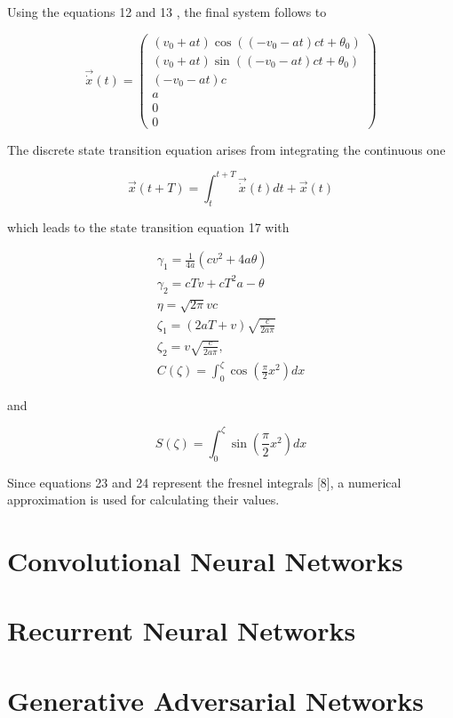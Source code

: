 Using the equations 12 and 13 , the final system follows to

$$
\overrightarrow{\dot{x}}(t)=\left(\begin{array}{c}
	\left(v_{0}+a t\right) \cos \left(\left(-v_{0}-a t\right) c t+\theta_{0}\right) \\
	\left(v_{0}+a t\right) \sin \left(\left(-v_{0}-a t\right) c t+\theta_{0}\right) \\
	\left(-v_{0}-a t\right) c \\
	a \\
	0 \\
	0
\end{array}\right)
$$

The discrete state transition equation arises from integrating the continuous one

$$
\vec{x}(t+T)=\int_{t}^{t+T} \overrightarrow{\dot{x}}(t) d t+\vec{x}(t)
$$

which leads to the state transition equation 17 with

$$
\begin{gathered}
	\gamma_{1}=\frac{1}{4 a}\left(c v^{2}+4 a \theta\right) \\
	\gamma_{2}=c T v+c T^{2} a-\theta \\
	\eta=\sqrt{2 \pi} v c \\
	\zeta_{1}=(2 a T+v) \sqrt{\frac{c}{2 a \pi}} \\
	\zeta_{2}=v \sqrt{\frac{c}{2 a \pi}}, \\
	C(\zeta)=\int_{0}^{\zeta} \cos \left(\frac{\pi}{2} x^{2}\right) d x
\end{gathered}
$$

and

$$
S(\zeta)=\int_{0}^{\zeta} \sin \left(\frac{\pi}{2} x^{2}\right) d x
$$

Since equations 23 and 24 represent the fresnel integrals [8], a numerical approximation is used for calculating their values.

\section{Convolutional Neural Networks}
\label{sec:3_cnns}

\section{Recurrent Neural Networks}
\label{sec:3_rnns}

\section{Generative Adversarial Networks}
\label{sec:3_gans}

